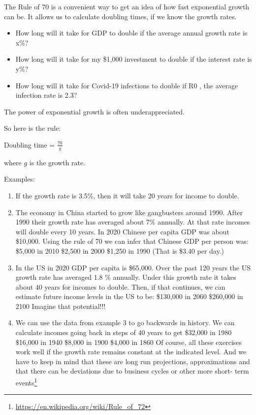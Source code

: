 \documentclass[
]{book}
\providecommand{\tightlist}{%
  \setlength{\itemsep}{0pt}\setlength{\parskip}{0pt}}
\begin{document}
The Rule of 70 is a convenient way to get an idea of how fast exponential growth can be. It allows us to calculate doubling times, if we know the growth rates.

\begin{itemize}
\tightlist
\item
  How long will it take for GDP to double if the average annual growth rate is x\%?
\item
  How long will it take for my \$1,000 investment to double if the interest rate is y\%?
\item
  How long will it take for Covid-19 infections to double if R0 , the average infection rate is 2.3?
\end{itemize}

The power of exponential growth is often underappreciated.

So here is the rule:

Doubling time = \(\frac{70}{g}\)

where \(g\) is the growth rate.

Examples:

\begin{enumerate}
\def\labelenumi{\arabic{enumi}.}
\item
  If the growth rate is 3.5\%, then it will take 20 years for income to double.
\item
  The economy in China started to grow like gangbusters around 1990. After 1990 their growth rate has averaged about 7\% annually. At that rate incomes will double every 10 years. In 2020 Chinese per capita GDP was about \$10,000. Using the rule of 70 we can infer that Chinese GDP per person was:
  \$5,000 in 2010
  \$2,500 in 2000
  \$1,250 in 1990 (That is \$3.40 per day.)
\item
  In the US in 2020 GDP per capita is \$65,000. Over the past 120 years the US growth rate has averaged 1.8 \% annually. Under this growth rate it takes about 40 years for incomes to double. Then, if that continues, we can estimate future income levels in the US to be:
  \$130,000 in 2060
  \$260,000 in 2100
  Imagine that potential!!!
\item
  We can use the data from example 3 to go backwards in history. We can calculate incomes going back in steps of 40 years to get
  \$32,000 in 1980
  \$16,000 in 1940
  \$8,000 in 1900
  \$4,000 in 1860
  Of course, all these exercises work well if the growth rate remains constant at the indicated level. And we have to keep in mind that these are long run projections, approximations and that there can be deviations due to business cycles or other more short- term events\footnote{\url{https://en.wikipedia.org/wiki/Rule_of_72}}
\end{enumerate}
\end{document}
